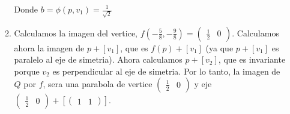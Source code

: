 \documentclass{article}
\begin{document}
\begin{enumerate}[label=(\Alph*)]
\begin{enumerate}[label=\roman*)]
\[\]
Donde $b = \phi(p,v_1) = \frac{1}{\sqrt{2}}$
\\
\item Calculamos la imagen del vertice, $f(-\frac{5}{8}, -\frac{9}{8}) =
\begin{pmatrix} \frac{1}{2} & 0\end{pmatrix}$. Calculamos ahora la imagen de $p + [v_1]$, que es
$f(p) + [v_1]$ (ya que $p + [v_1]$ es paralelo al eje de simetria). Ahora calculamos $p +[v_2]$, que es
invariante porque $v_2$ es perpendicular al eje de simetria. Por lo tanto, la imagen de $Q$ por $f$, sera
una parabola de vertice $\begin{pmatrix} \frac{1}{2} & 0\end{pmatrix}$ y eje
$\begin{pmatrix} \frac{1}{2} & 0\end{pmatrix} + \left[ \begin{pmatrix} 1 & 1 \end{pmatrix}\right]$.

\end{enumerate}
\end{enumerate}
\end{document}

